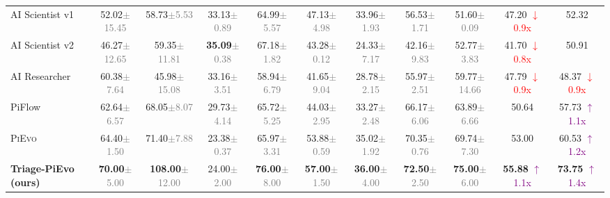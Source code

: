 \documentclass{article}
\newcommand{\pievo}{\textsc{PiEvo}\,}
\begin{document}
\begin{table}[!ht]
{\begin{tabular}{l | cc | cc | cc | cc | cc}
AI Scientist v1 & 52.02\textcolor{gray}{\tiny$\pm$15.45} & 58.73\textcolor{gray}{\tiny$\pm$5.53} & 33.13\textcolor{gray}{\tiny$\pm$0.89} & 64.99\textcolor{gray}{\tiny$\pm$5.57} & 47.13\textcolor{gray}{\tiny$\pm$4.98} & 33.96\textcolor{gray}{\tiny$\pm$1.93} & 56.53\textcolor{gray}{\tiny$\pm$1.71} & 51.60\textcolor{gray}{\tiny$\pm$0.09} & 47.20 \textcolor{red}{\small $\downarrow$ 0.9x} & 52.32 \\
AI Scientist v2 & 46.27\textcolor{gray}{\tiny$\pm$12.65} & 59.35\textcolor{gray}{\tiny$\pm$11.81} & \textbf{35.09}\textcolor{gray}{\tiny$\pm$0.38} & 67.18\textcolor{gray}{\tiny$\pm$1.82} & 43.28\textcolor{gray}{\tiny$\pm$0.12} & 24.33\textcolor{gray}{\tiny$\pm$7.17} & 42.16\textcolor{gray}{\tiny$\pm$9.83} & 52.77\textcolor{gray}{\tiny$\pm$3.83} & 41.70 \textcolor{red}{\small $\downarrow$ 0.8x} & 50.91 \\
AI Researcher & 60.38\textcolor{gray}{\tiny$\pm$7.64} & 45.98\textcolor{gray}{\tiny$\pm$15.08} & 33.16\textcolor{gray}{\tiny$\pm$3.51} & 58.94\textcolor{gray}{\tiny$\pm$6.79} & 41.65\textcolor{gray}{\tiny$\pm$9.04} & 28.78\textcolor{gray}{\tiny$\pm$2.15} & 55.97\textcolor{gray}{\tiny$\pm$2.51} & 59.77\textcolor{gray}{\tiny$\pm$14.66} & 47.79 \textcolor{red}{\small $\downarrow$ 0.9x} & 48.37 \textcolor{red}{\small $\downarrow$ 0.9x} \\
PiFlow & 62.64\textcolor{gray}{\tiny$\pm$6.57} & 68.05\textcolor{gray}{\tiny$\pm$8.07} & 29.73\textcolor{gray}{\tiny$\pm$4.14} & 65.72\textcolor{gray}{\tiny$\pm$5.25} & 44.03\textcolor{gray}{\tiny$\pm$2.95} & 33.27\textcolor{gray}{\tiny$\pm$2.48} & 66.17\textcolor{gray}{\tiny$\pm$6.06} & 63.89\textcolor{gray}{\tiny$\pm$6.66} & 50.64 & 57.73 \textcolor{purple}{\small $\uparrow$ 1.1x} \\
\pievo{} & 64.40\textcolor{gray}{\tiny$\pm$1.50} & 71.40\textcolor{gray}{\tiny$\pm$7.88} & 23.38\textcolor{gray}{\tiny$\pm$0.37} & 65.97\textcolor{gray}{\tiny$\pm$3.31} & 53.88\textcolor{gray}{\tiny$\pm$0.59} & 35.02\textcolor{gray}{\tiny$\pm$1.92} & 70.35\textcolor{gray}{\tiny$\pm$0.76} & 69.74\textcolor{gray}{\tiny$\pm$7.30} & 53.00 & 60.53 \textcolor{purple}{\small $\uparrow$ 1.2x} \\
\textbf{Triage-PiEvo (ours)} & \textbf{70.00}\textcolor{gray}{\tiny$\pm$5.00} & \textbf{108.00}\textcolor{gray}{\tiny$\pm$12.00} & 24.00\textcolor{gray}{\tiny$\pm$2.00} & \textbf{76.00}\textcolor{gray}{\tiny$\pm$8.00} & \textbf{57.00}\textcolor{gray}{\tiny$\pm$1.50} & \textbf{36.00}\textcolor{gray}{\tiny$\pm$4.00} & \textbf{72.50}\textcolor{gray}{\tiny$\pm$2.50} & \textbf{75.00}\textcolor{gray}{\tiny$\pm$6.00} & \textbf{55.88} \textcolor{purple}{\small $\uparrow$ 1.1x} & \textbf{73.75} \textcolor{purple}{\small $\uparrow$ 1.4x} \\

\end{tabular}}
\end{table}
\end{document}
